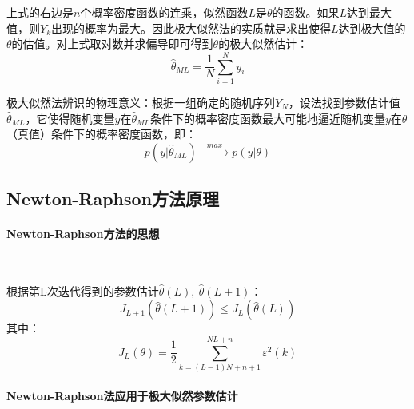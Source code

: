 \documentclass[UTF8, twocolumn]{article}
\begin{document}
上式的右边是$n$个概率密度函数的连乘，似然函数$L$是$\theta$的函数。如果$L$达到最大值，则${Y_k}$出现的概率为最大。因此极大似然法的实质就是求出使得$L$达到极大值的$\theta$的估值。对上式取对数并求偏导即可得到$\theta$的极大似然估计：
\begin{equation*}
    \hat{\theta}_{ML} = \frac{1}{N}\sum_{i=1}^Ny_i
\end{equation*}

极大似然法辨识的物理意义：根据一组确定的随机序列$Y_N$，设法找到参数估计值$\hat{\theta}_{ML}$，它使得随机变量$y$在$\hat{\theta}_{ML}$条件下的概率密度函数最大可能地逼近随机变量$y$在$\theta$（真值）条件下的概率密度函数，即：
\begin{equation*}
    p(y|\hat{\theta}_{ML}) \stackrel{max}{--\rightarrow} p(y|\theta)
\end{equation*}

\subsection{Newton-Raphson方法原理}
\paragraph{Newton-Raphson方法的思想}~{}

根据第L次迭代得到的参数估计$\hat{\theta}(L),\ \hat{\theta}(L + 1)$：
\begin{equation*}
    J_{L + 1}(\hat{\theta}(L + 1)) \le J_L(\hat{\theta}(L)) 
\end{equation*}
其中：
\begin{equation*}
    J_L(\theta) = \frac{1}{2}\sum_{k = (L - 1)N + n + 1}^{NL + n}\varepsilon^2(k) 
\end{equation*}


\paragraph{Newton-Raphson法应用于极大似然参数估计}~{}
\end{document}
